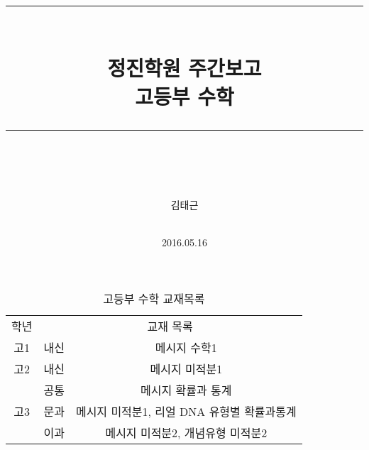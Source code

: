 \documentclass[idxtotoc,hyperref,openany]{labbook} %
\newcommand{\HRule}{\rule{\linewidth}{0.5mm}} %
\begin{document}

\frontmatter %
\title{
\begin{center}
\HRule \\[0.4cm]
{\Huge \bfseries 정진학원 주간보고  \\[0.5cm] \Large 고등부 수학}\\[0.4cm] %
\HRule \\[1.5cm]
\end{center}
}
\author{\LARGE 김태근 \\  \\[2cm]} %
\date{2016.05.16} %
\maketitle

\tableofcontents

\mainmatter %












\begin{table}[h]
\centering
\begin{adjustbox}{width=\textwidth}
\begin{tabular}{c||c|c}
\toprule
\midrule
학년 & \multicolumn{2}{c}{교재 목록} \\
\hhline{=||==}
고1 & 내신 & 메시지 수학1 \\
\hline
고2 & 내신 & 메시지 미적분1\\
\hline
\multirow{3}{*}{고3} & 공통 & 메시지 확률과 통계 \\ \hhline{~--}
					& 문과 & 메시지 미적분1, 리얼 DNA 유형별 확률과통계\\ \hhline{~--}
					& 이과 & 메시지 미적분2, 개념유형 미적분2\\

\hline
\end{tabular}
\end{adjustbox}
\caption{\label{tab:i} 고등부 수학 교재목록 }
\end{table}
\end{document}
